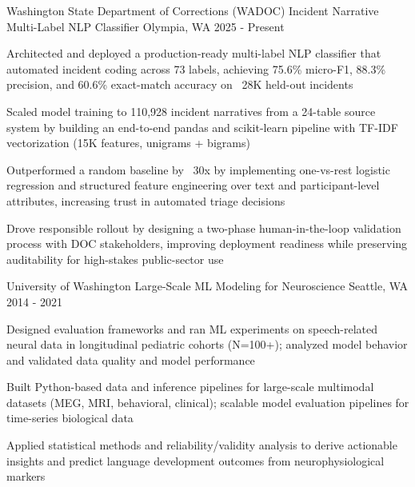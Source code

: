 \begin{cventries}
\cventry
  {Washington State Department of Corrections (WADOC)} %
  {Incident Narrative Multi-Label NLP Classifier} %
  {Olympia, WA} %
  {2025 - Present} %
  {
    \begin{cvitems} %
      \item {Architected and deployed a production-ready multi-label NLP classifier that automated incident coding across 73 labels, achieving 75.6\% micro-F1, 88.3\% precision, and 60.6\% exact-match accuracy on ~28K held-out incidents}
      \item {Scaled model training to 110,928 incident narratives from a 24-table source system by building an end-to-end pandas and scikit-learn pipeline with TF-IDF vectorization (15K features, unigrams + bigrams)}
      \item {Outperformed a random baseline by ~30x by implementing one-vs-rest logistic regression and structured feature engineering over text and participant-level attributes, increasing trust in automated triage decisions}
      \item {Drove responsible rollout by designing a two-phase human-in-the-loop validation process with DOC stakeholders, improving deployment readiness while preserving auditability for high-stakes public-sector use}
    \end{cvitems}
  }

    \cventry
      {University of Washington} %
      {Large-Scale ML Modeling for Neuroscience} %
      {Seattle, WA} %
      {2014 - 2021} %
      {
        \begin{cvitems} %
          \item {Designed evaluation frameworks and ran ML experiments on speech-related neural data in longitudinal pediatric cohorts (N=100+); analyzed model behavior and validated data quality and model performance}
          \item {Built Python-based data and inference pipelines for large-scale multimodal datasets (MEG, MRI, behavioral, clinical); scalable model evaluation pipelines for time-series biological data}
          \item {Applied statistical methods and reliability/validity analysis to derive actionable insights and predict language development outcomes from neurophysiological markers}
        \end{cvitems}
      }


\end{cventries}
